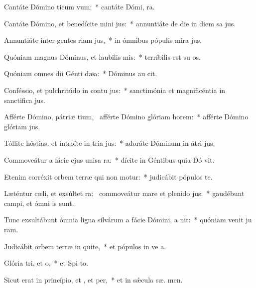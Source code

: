 \item Cantáte Dómino ticum vum:~* cantáte Dómi,  ra.
\item Cantáte Dómino, et benedícite mini jus:~* annuntiáte de die in diem sa jus.
\item Annuntiáte inter gentes riam jus,~* in ómnibus pópulis mira jus.
\item Quóniam magnus Dóminus, et laubilis mis:~* terríbilis est su  os.
\item Quóniam omnes dii Génti dæa:~* Dóminus au  cit.
\item Conféssio, et pulchritúdo in contu jus:~* sanctimónia et magnificéntia in sanctifica jus.
\item Afférte Dómino, pátriæ tium,~\pscross{} afférte Dómino glóriam  horem:~* afférte Dómino glóriam  jus.
\item Tóllite hóstias, et introíte in tria jus:~* adoráte Dóminum in átri  jus.
\item Commoveátur a fácie ejus unisa ra:~* dícite in Géntibus quia Dó vit.
\item Etenim corréxit orbem terræ qui non motur:~* judicábit pópulos  te.
\item Læténtur cæli, et exsúltet ra:~\pscross{} commoveátur mare et plenido jus:~* gaudébunt campi, et ómni   is sunt.
\item Tunc exsultábunt ómnia ligna silvárum a fácie Dómini, a nit:~* quóniam venit ju ram.
\item Judicábit orbem terræ in quite,~* et pópulos in ve a.
\item Glória tri, et o,~* et Spi to.
\item Sicut erat in princípio, et , et per,~* et in sǽcula sæ. men.
